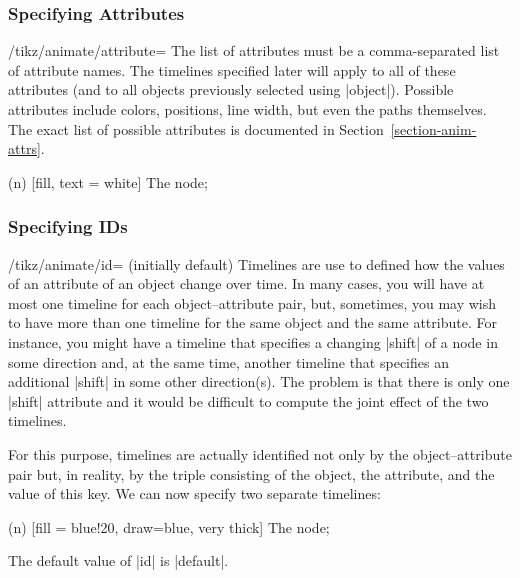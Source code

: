 \subsubsection{Specifying Attributes}
\label{section-anim-def-attr}

\begin{key}{/tikz/animate/attribute=}
    The list of attributes must be a comma-separated list of attribute names.
    The timelines specified later will apply to all of these attributes (and to
    all objects previously selected using |object|). Possible attributes
    include colors, positions, line width, but even the paths themselves. The
    exact list of possible attributes is documented in
    Section~\ref{section-anim-attrs}.
\begin{codeexample}[imagesource={standalone/pgfmanual-en-tikz-animations-animation-11.svg}]
\tikz [animate = {attribute = fill, n: = { 0s = "red", 2s = "blue",
                                           begin on = click } }]
  \node (n) [fill, text = white] {The node};
\end{codeexample}
\end{key}


\subsubsection{Specifying IDs}
\label{section-anim-def-id}

\begin{key}{/tikz/animate/id= (initially default)}
    Timelines are use to defined how the values of an attribute of an object
    change over time. In many cases, you will have at most one timeline for
    each object--attribute pair, but, sometimes, you may wish to have more than
    one timeline for the same object and the same attribute. For instance, you
    might have a timeline that specifies a changing |shift| of a node in some
    direction and, at the same time, another timeline that specifies an
    additional |shift| in some other direction(s). The problem is that there is
    only one |shift| attribute and it would be difficult to compute the joint
    effect of the two timelines.

    For this purpose, timelines are actually identified not only by the
    object--attribute pair but, in reality, by the triple consisting of the
    object, the attribute, and the value of this key. We can now specify two
    separate timelines:
\begin{codeexample}[imagesource={standalone/pgfmanual-en-tikz-animations-animation-12.svg}]
\tikz [animate = {
  id = 1, n:shift = { 0s = "{(0,0)}", 2s = "{(0,5mm)}", begin on = click },
  id = 2, n:shift = { 0s = "{(0,0)}", 2s = "{(5mm,0)}", begin on = click }
}]
  \node (n) [fill = blue!20, draw=blue, very thick] {The node};
\end{codeexample}

    The default value of |id| is |default|.
\end{key}

